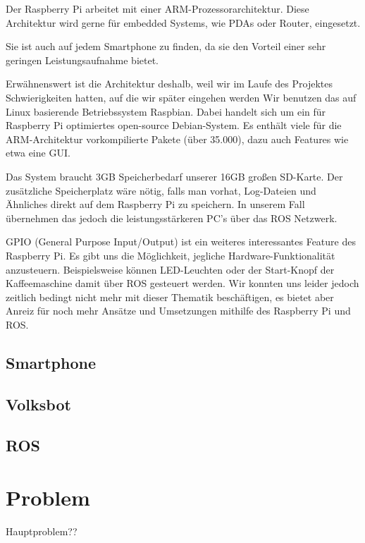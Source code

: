 \documentclass[12pt]{article}
\begin{document}
Der Raspberry Pi arbeitet mit einer ARM-Prozessorarchitektur.
Diese Architektur wird gerne für embedded Systems, wie PDAs oder Router, eingesetzt.

Sie ist auch auf jedem Smartphone zu finden, da sie den Vorteil einer sehr geringen Leistungsaufnahme bietet. 

Erwähnenswert ist die Architektur deshalb, weil wir im Laufe des Projektes Schwierigkeiten hatten, auf die wir später eingehen werden
Wir benutzen das auf Linux basierende Betriebssystem Raspbian.
Dabei handelt sich um ein für Raspberry Pi optimiertes open-source Debian-System.
Es enthält viele für die ARM-Architektur vorkompilierte Pakete (über 35.000), dazu auch Features wie etwa eine GUI.

Das System braucht 3GB Speicherbedarf unserer 16GB großen SD-Karte.
Der zusätzliche Speicherplatz wäre nötig, falls man vorhat, Log-Dateien und Ähnliches direkt auf dem Raspberry Pi zu speichern. 
In unserem Fall übernehmen das jedoch die leistungsstärkeren PC's über das ROS Netzwerk.

GPIO (General Purpose Input/Output) ist ein weiteres interessantes Feature des Raspberry Pi.
Es gibt uns die Möglichkeit, jegliche Hardware-Funktionalität anzusteuern.
Beispielsweise können LED-Leuchten oder der Start-Knopf der Kaffeemaschine damit über ROS gesteuert werden.
Wir konnten uns leider jedoch zeitlich bedingt nicht mehr mit dieser Thematik beschäftigen, es bietet aber Anreiz für noch mehr Ansätze und Umsetzungen mithilfe des Raspberry Pi und ROS.


\subsection{Smartphone}

\subsection{Volksbot}

\subsection{ROS}



\section{Problem}

Hauptproblem??
\end{document}
